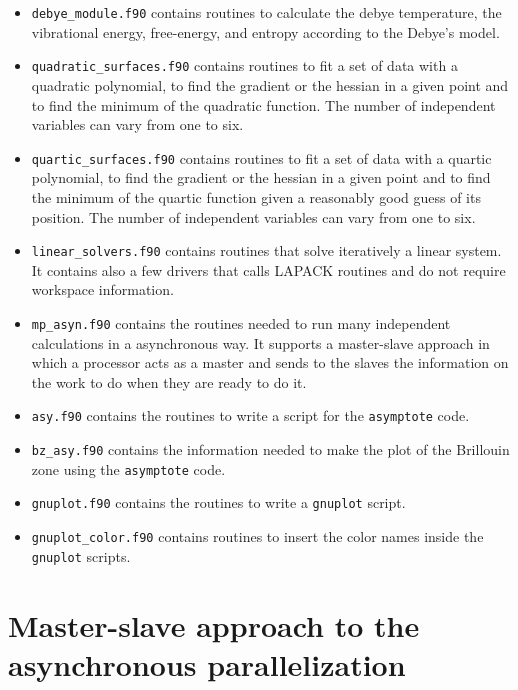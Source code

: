 \documentclass[12pt,a4paper]{article}
\begin{document}
\begin{itemize}
\item
\texttt{debye\_module.f90} contains routines to calculate the debye 
temperature, the vibrational energy, free-energy, and entropy according
to the Debye's model.

\item
\texttt{quadratic\_surfaces.f90} contains routines to fit a set of data
with a quadratic polynomial, to find the gradient or the hessian in 
a given point and to find the minimum of the quadratic function. 
The number of independent variables can vary from one to six.

\item
\texttt{quartic\_surfaces.f90} contains routines to fit a set of data
with a quartic polynomial, to find the gradient or the hessian in 
a given point and to find the minimum of the quartic function given a 
reasonably good guess of its position.
The number of independent variables can vary from one to six.

\item
\texttt{linear\_solvers.f90} contains routines that solve iteratively
a linear system. It contains also a few drivers that calls LAPACK routines
and do not require workspace information. 

\item
\texttt{mp\_asyn.f90} contains the routines needed to run many 
independent calculations in a asynchronous way. It supports a master-slave
approach in which a processor acts as a master and sends to the slaves
the information on the work to do when they are ready to do it.

\item
\texttt{asy.f90} contains the routines to write a script for the
\texttt{asymptote} code.

\item
\texttt{bz\_asy.f90} contains the information needed to make the plot       
of the Brillouin zone using the \texttt{asymptote} code.      

\item
\texttt{gnuplot.f90} contains the routines to write a \texttt{gnuplot} script.

\item
\texttt{gnuplot\_color.f90} contains routines to insert the color names
inside the \texttt{gnuplot} scripts.

\end{itemize}

\newpage
\section{\color{coral}Master-slave approach to the asynchronous parallelization}
\end{document}
